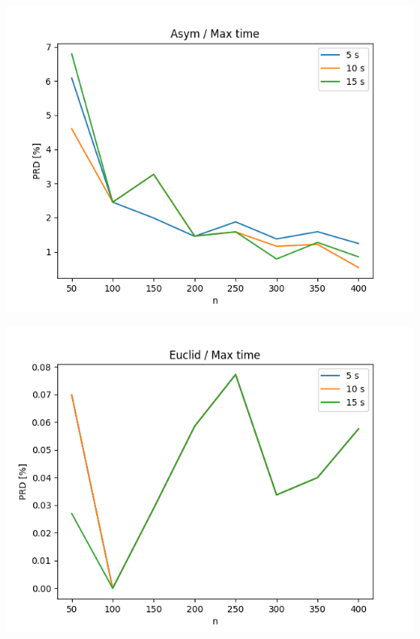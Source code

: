 \documentclass{article}
\begin{document}
\begin{center}
\includegraphics[width=\textwidth, 
                   height = 0.4\textheight, 
                   keepaspectratio]
                  {plots/asym_9_max_time} 
\end{center}

\begin{center}
\includegraphics[width=\textwidth, 
                   height = 0.4\textheight, 
                   keepaspectratio]
                  {plots/euclid_9_max_time} 
\end{center}
\end{document}
